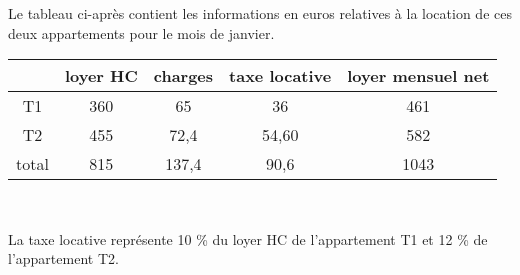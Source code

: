 \documentclass[12pt,a4paper]{article}
\renewcommand{\arraystretch}{0.7}
\theoremstyle{break}
\begin{document}
	Le tableau ci-après contient les informations en euros relatives à la location de ces deux appartements pour le mois de janvier.\\
	\begin{center}
	\renewcommand{\arraystretch}{2}
	\begin{tabular}{|c|c|c|c|c|}
		\hline
		&loyer HC& charges& taxe locative &loyer mensuel net\\
		\hline
		T1& 360 &\cellcolor{blue!70}65&\cellcolor{red!45}36&461\\ 
		\hline
		T2 &\cellcolor{green!85}455&\cellcolor{yellow}72,4&54,60&\cellcolor{green!25}582\\
		\hline
		total&\cellcolor{magenta!90}815&\cellcolor{cyan}137,4&\cellcolor{red}90,6& 1043\\
		\hline
	\end{tabular}\\
	\end{center}
	La taxe locative représente 10 \% du loyer HC de l’appartement T1 et 12 \% de l’appartement T2.
\end{document}
